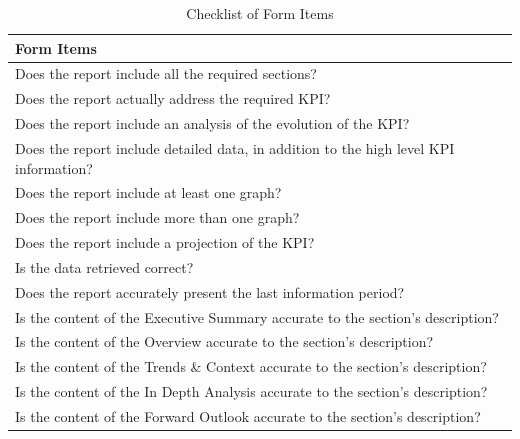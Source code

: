 \documentclass[a4paper]{report}
\begin{document}
\begin{table}[H]
\centering
\begin{tabular}{|p{14cm}|}
    \hline
    \textbf{Form Items} \\ \hline
    Does the report include all the required sections? \\ \hline
    Does the report actually address the required KPI? \\ \hline
    Does the report include an analysis of the evolution of the KPI? \\ \hline
    Does the report include detailed data, in addition to the high level KPI information? \\ \hline
    Does the report include at least one graph? \\ \hline
    Does the report include more than one graph? \\ \hline
    Does the report include a projection of the KPI? \\ \hline
    Is the data retrieved correct? \\ \hline
    Does the report accurately present the last information period? \\ \hline
    Is the content of the Executive Summary accurate to the section's description? \\ \hline
    Is the content of the Overview accurate to the section's description? \\ \hline
    Is the content of the Trends \& Context accurate to the section's description? \\ \hline
    Is the content of the In Depth Analysis accurate to the section's description? \\ \hline
    Is the content of the Forward Outlook accurate to the section's description? \\ \hline
\end{tabular}
\caption{Checklist of Form Items}
\end{table}
\end{document}
